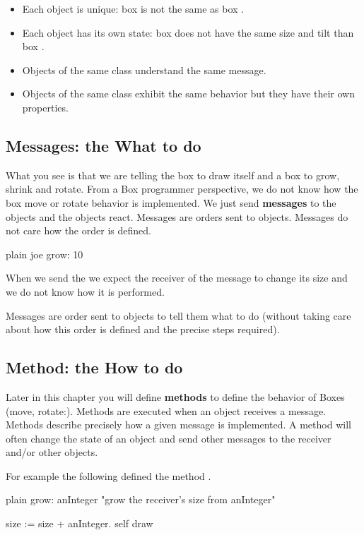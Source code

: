 \documentclass[10pt,twoside,english]{_support/latex/sbabook/sbabook}
\begin{document}
\begin{itemize}
\item Each object is unique: box  is not the same as box . 
\item Each object has its own state: box  does not have the same size and tilt than box .
\item Objects of the same class understand the same message.
\item Objects of the same class exhibit the same behavior but they have their own properties.
\end{itemize}
\subsection{Messages: the What to do}
What you see is that we are telling the box to draw itself and a box to grow, shrink and rotate. From a Box programmer perspective, we do not know how the box move or rotate behavior is implemented. We just send \textbf{messages} to the objects and the objects react. Messages are orders sent to objects. Messages do not care how the order is defined.

\begin{displaycode}{plain}
joe grow: 10
\end{displaycode}

 When we send the  we expect the receiver of the message to change its size and we do not know how it is performed. 
 

\begin{note}
Messages are order sent to objects to tell them what to do (without taking care about how this order is defined and the precise steps required).
\end{note}
\subsection{Method: the How to do}
Later in this chapter you will define \textbf{methods} to define the behavior of Boxes (move, rotate:).
Methods are executed when an object receives a message. Methods describe precisely how a given message is implemented. A method will often change the state of an object and send other messages to the receiver and/or other objects. 

For example the following defined the method .

\begin{displaycode}{plain}
grow: anInteger 
   "grow the receiver's size from anInteger"
   
    size := size + anInteger.
    self draw
\end{displaycode}
\end{document}
